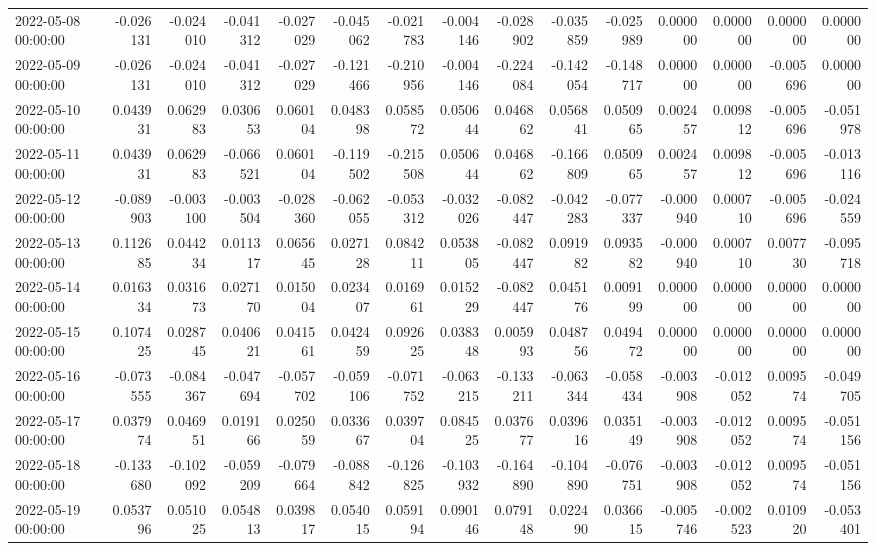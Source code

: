 \begin{tabular}{lrrrrrrrrrrrrrr}
2022-05-08 00:00:00 & -0.026131 & -0.024010 & -0.041312 & -0.027029 & -0.045062 & -0.021783 & -0.004146 & -0.028902 & -0.035859 & -0.025989 & 0.000000 & 0.000000 & 0.000000 & 0.000000 \\
2022-05-09 00:00:00 & -0.026131 & -0.024010 & -0.041312 & -0.027029 & -0.121466 & -0.210956 & -0.004146 & -0.224084 & -0.142054 & -0.148717 & 0.000000 & 0.000000 & -0.005696 & 0.000000 \\
2022-05-10 00:00:00 & 0.043931 & 0.062983 & 0.030653 & 0.060104 & 0.048398 & 0.058572 & 0.050644 & 0.046862 & 0.056841 & 0.050965 & 0.002457 & 0.009812 & -0.005696 & -0.051978 \\
2022-05-11 00:00:00 & 0.043931 & 0.062983 & -0.066521 & 0.060104 & -0.119502 & -0.215508 & 0.050644 & 0.046862 & -0.166809 & 0.050965 & 0.002457 & 0.009812 & -0.005696 & -0.013116 \\
2022-05-12 00:00:00 & -0.089903 & -0.003100 & -0.003504 & -0.028360 & -0.062055 & -0.053312 & -0.032026 & -0.082447 & -0.042283 & -0.077337 & -0.000940 & 0.000710 & -0.005696 & -0.024559 \\
2022-05-13 00:00:00 & 0.112685 & 0.044234 & 0.011317 & 0.065645 & 0.027128 & 0.084211 & 0.053805 & -0.082447 & 0.091982 & 0.093582 & -0.000940 & 0.000710 & 0.007730 & -0.095718 \\
2022-05-14 00:00:00 & 0.016334 & 0.031673 & 0.027170 & 0.015004 & 0.023407 & 0.016961 & 0.015229 & -0.082447 & 0.045176 & 0.009199 & 0.000000 & 0.000000 & 0.000000 & 0.000000 \\
2022-05-15 00:00:00 & 0.107425 & 0.028745 & 0.040621 & 0.041561 & 0.042459 & 0.092625 & 0.038348 & 0.005993 & 0.048756 & 0.049472 & 0.000000 & 0.000000 & 0.000000 & 0.000000 \\
2022-05-16 00:00:00 & -0.073555 & -0.084367 & -0.047694 & -0.057702 & -0.059106 & -0.071752 & -0.063215 & -0.133211 & -0.063344 & -0.058434 & -0.003908 & -0.012052 & 0.009574 & -0.049705 \\
2022-05-17 00:00:00 & 0.037974 & 0.046951 & 0.019166 & 0.025059 & 0.033667 & 0.039704 & 0.084525 & 0.037677 & 0.039616 & 0.035149 & -0.003908 & -0.012052 & 0.009574 & -0.051156 \\
2022-05-18 00:00:00 & -0.133680 & -0.102092 & -0.059209 & -0.079664 & -0.088842 & -0.126825 & -0.103932 & -0.164890 & -0.104890 & -0.076751 & -0.003908 & -0.012052 & 0.009574 & -0.051156 \\
2022-05-19 00:00:00 & 0.053796 & 0.051025 & 0.054813 & 0.039817 & 0.054015 & 0.059194 & 0.090146 & 0.079148 & 0.022490 & 0.036615 & -0.005746 & -0.002523 & 0.010920 & -0.053401 \\

\end{tabular}
